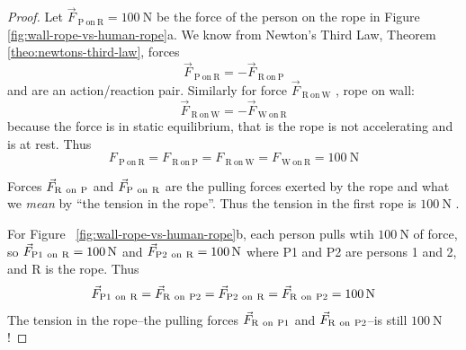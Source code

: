 \begin{Answer}
    \begin{proof}
        Let
        $
            \vec{F}_{\mathrm{~P~on~R}} = \qty{100}{\newton}
        $ be the force of the person on the rope in Figure~%
        \ref{fig:wall-rope-vs-human-rope}a.  We know from Newton's Third
        Law, Theorem~%
        \ref{theo:newtons-third-law}, forces
        \begin{equation}
            \vec{F}_{\mathrm{~P~on~R}} = -\vec{F}_{\mathrm{~R~on~P}}
        \end{equation}
        and are an action/reaction pair.  Similarly for force
        $
            \vec{F}_{\mathrm{~R~on~W}}
        $%
        , rope on wall:
        \begin{equation}
            \vec{F}_{\mathrm{~R~on~W}}=-\vec{F}_{\mathrm{~W~on~R}}
        \end{equation}
        because the force is in static equilibrium, that is the rope is
        not accelerating and is at rest.  Thus
        \begin{equation}
            F_{\mathrm{~P~on~R}} = F_\mathrm{~R~on~P} = F_{\mathrm{~R~on~W}}
            = F_{\mathrm{~W~on~R}} = \qty{100}{\newton}
        \end{equation}

        Forces
        $
            \vec{F}_{\mathrm{R~on~P}}
        $ and
        $
            \vec{F}_{\mathrm{P~on~R}}
        $ are the pulling forces exerted by the rope and what we \emph{mean}
        by ``the tension in the rope''.  Thus the tension in the first
        rope is
        $
            \qty{100}{\newton}
        $%
        .

        For Figure~%
        \ref{fig:wall-rope-vs-human-rope}b, each person pulls wtih
        $
            \qty{100}{\newton}
        $ of force, so
        $
            \vec{F}_{\mathrm{P1~on~R}}=\qty{100}{\newton}
        $ and
        $
            \vec{F}_{\mathrm{P2~on~R}}=\qty{100}{\newton}
        $ where P1 and P2 are persons 1 and 2, and R is the rope.  Thus
        \begin{equation}
            \vec{F}_{\mathrm{P1~on~R}} = \vec{F}_{\mathrm{R~on~P2}} = \vec{F}_{\mathrm{P2~on~R}} = \vec{F}_{\mathrm{R~on~P2}} = \qty{100}{\newton}
        \end{equation}
        The tension in the rope--the pulling forces
        $
            \vec{F}_{\mathrm{R~on~P1}}
        $ and
        $
            \vec{F}_{\mathrm{R~on~P2}}
        $--is still
        $
            \qty{100}{\newton}
        $%
        !

    \end{proof}
\end{Answer}

